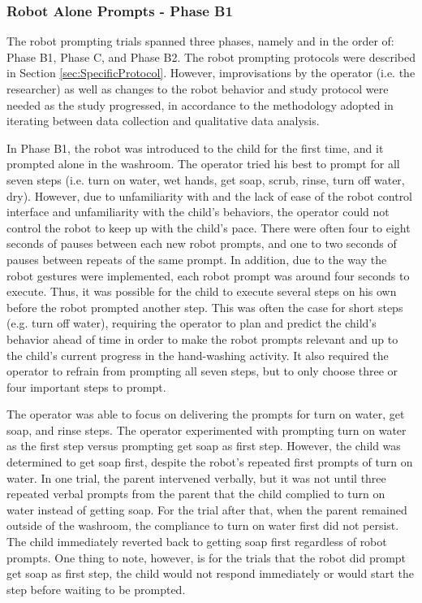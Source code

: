 \subsubsection{Robot Alone Prompts - Phase B1}
The robot prompting trials spanned three phases, namely and in the order of: Phase B1, Phase C, and Phase B2.  The robot prompting protocols were described in Section \ref{sec:SpecificProtocol}.  However, improvisations by the operator (i.e. the researcher) as well as changes to the robot behavior and study protocol were needed as the study progressed, in accordance to the methodology adopted in iterating between data collection and qualitative data analysis.

In Phase B1, the robot was introduced to the child for the first time, and it prompted alone in the washroom.  The operator tried his best to prompt for all seven steps (i.e. turn on water, wet hands, get soap, scrub, rinse, turn off water, dry).  However, due to unfamiliarity with and the lack of ease of the robot control interface and unfamiliarity with the child's behaviors, the operator could not control the robot to keep up with the child's pace.  There were often four to eight seconds of pauses between each new robot prompts, and one to two seconds of pauses between repeats of the same prompt.  In addition, due to the way the robot gestures were implemented, each robot prompt was around four seconds to execute.  Thus, it was possible for the child to execute several steps on his own before the robot prompted another step.  This was often the case for short steps (e.g. turn off water), requiring the operator to plan and predict the child's behavior ahead of time in order to make the robot prompts relevant and up to the child's current progress in the hand-washing activity.  It also required the operator to refrain from prompting all seven steps, but to only choose three or four important steps to prompt.

The operator was able to focus on delivering the prompts for turn on water, get soap, and rinse steps.  The operator experimented with prompting turn on water as the first step versus prompting get soap as first step.  However, the child was determined to get soap first, despite the robot's repeated first prompts of turn on water.  In one trial, the parent intervened verbally, but it was not until three repeated verbal prompts from the parent that the child complied to turn on water instead of getting soap.  For the trial after that, when the parent remained outside of the washroom, the compliance to turn on water first did not persist.  The child immediately reverted back to getting soap first regardless of robot prompts.  One thing to note, however, is for the trials that the robot did prompt get soap as first step, the child would not respond immediately or would start the step before waiting to be prompted.

